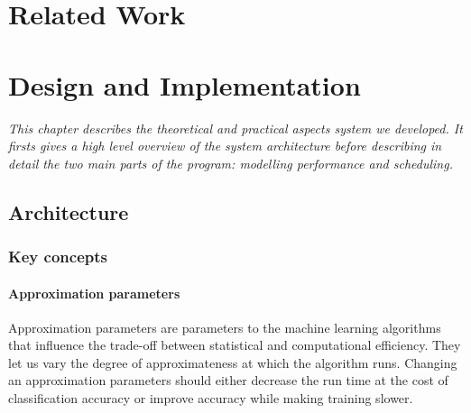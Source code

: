 \documentclass[a4paper,12pt,twoside,openright]{report}
\begin{document}






\chapter{Related Work} 










\chapter{Design and Implementation} 



\textit{This chapter describes the theoretical and practical aspects system we developed. It firsts gives a high level overview of the system architecture before describing in detail the two main parts of the program: modelling performance and scheduling.}

\section{Architecture} %
\subsection{Key concepts}
\subsubsection{Approximation parameters}
Approximation parameters are parameters to the machine learning algorithms that influence the trade-off between statistical and computational efficiency. They let us vary the degree of approximateness at which the algorithm runs. Changing an approximation parameters should either decrease the run time at the cost of classification accuracy or improve accuracy while making training slower. 
\end{document}
